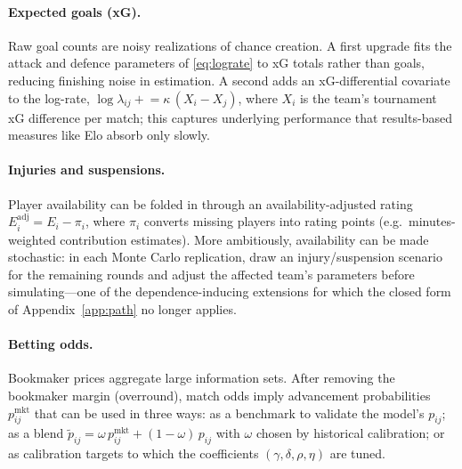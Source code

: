 \paragraph{Expected goals (xG).}
Raw goal counts are noisy realizations of chance creation. A first upgrade
fits the attack and defence parameters of \eqref{eq:lograte} to xG totals
rather than goals, reducing finishing noise in estimation. A second adds an
xG-differential covariate to the log-rate,
$\log \lambda_{ij} \mathrel{+}= \kappa\,(X_i - X_j)$, where $X_i$ is the
team's tournament xG difference per match; this captures underlying
performance that results-based measures like Elo absorb only slowly.

\paragraph{Injuries and suspensions.}
Player availability can be folded in through an availability-adjusted rating
$E_i^{\mathrm{adj}} = E_i - \pi_i$, where $\pi_i$ converts missing players
into rating points (e.g.\ minutes-weighted contribution estimates). More
ambitiously, availability can be made stochastic: in each Monte Carlo
replication, draw an injury/suspension scenario for the remaining rounds and
adjust the affected team's parameters before simulating---one of the
dependence-inducing extensions for which the closed form of
Appendix~\ref{app:path} no longer applies.

\paragraph{Betting odds.}
Bookmaker prices aggregate large information sets. After removing the
bookmaker margin (overround), match odds imply advancement probabilities
$p_{ij}^{\mathrm{mkt}}$ that can be used in three ways: as a benchmark to
validate the model's $p_{ij}$; as a blend
$\tilde{p}_{ij} = \omega\, p_{ij}^{\mathrm{mkt}} + (1 - \omega)\, p_{ij}$
with $\omega$ chosen by historical calibration; or as calibration targets to
which the coefficients $(\gamma, \delta, \rho, \eta)$ are tuned.

